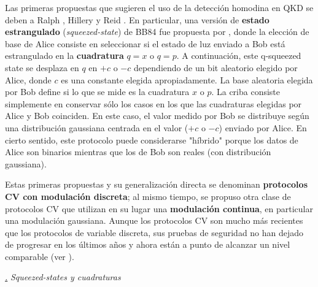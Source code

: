 \documentclass[a4paper,11pt]{book} %
\numberwithin{equation}{chapter}
\def\subsubiContadorIt{\par\addtocounter{subsubsection}{1}\underline{\it\thesubsubsection.}\hskip0.5cm \setcounter{subsubsubsectionIt}{0}}
\newcommand{\SubsubiIt}[1]{
		\subsubiContadorIt \textit{#1}
	}
\newcounter{subsubsubsectionIt}[subsubsection]
\begin{document}
Las primeras propuestas que sugieren el uso de la detección homodina en QKD se deben a Ralph \cite{bib_Continue_var_Ralph_1999}, Hillery \cite{bib_Continue_var_Hillery_2000} y Reid \cite{bib_Continue_var_Reid_2000}. En particular, una versión de \textbf{estado estrangulado} (\textit{squeezed-state}) de BB84 fue propuesta por \cite{bib_Continue_var_Hillery_2000}, donde la elección de base de Alice consiste en seleccionar si el estado de luz enviado a Bob está estrangulado en la \textbf{cuadratura} $q = x$ o $q = p$. A continuación, este q-squeezed state se desplaza en $q$ en $+c$ o $-c$ dependiendo de un bit aleatorio elegido por Alice, donde $c$ es una constante elegida apropiadamente. La base aleatoria elegida por Bob define si lo que se mide es la cuadratura $x$ o $p$. La criba consiste simplemente en conservar sólo los casos en los que las cuadraturas elegidas por Alice y Bob coinciden. En este caso, el valor medido por Bob se distribuye según una distribución gaussiana centrada en el valor ($+c$ o $-c$) enviado por Alice. En cierto sentido, este protocolo puede considerarse "híbrido" porque los datos de Alice son binarios mientras que los de Bob son reales (con distribución gaussiana).

Estas primeras propuestas y su generalización directa se denominan \textbf{protocolos CV con modulación discreta}; al mismo tiempo, se propuso otra clase de protocolos CV que utilizan en su lugar una \textbf{modulación continua}, en particular una modulación gaussiana. Aunque los protocolos CV son mucho más recientes que los protocolos de variable discreta, sus pruebas de seguridad no han dejado de progresar en los últimos años y ahora están a punto de alcanzar un nivel comparable (ver \cite{bib_QKD_resumen}).

		\SubsubiIt{Squeezed-states y cuadraturas}
		
\end{document}
